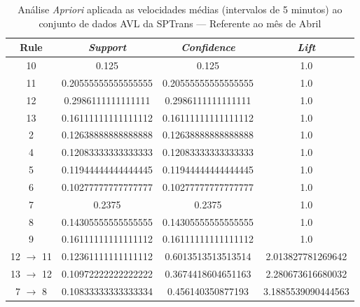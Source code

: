 \documentclass[
	12pt,				%
	oneside,			%
	a4paper,			%
	english,			%
	brazil				%
	]{abntex2ppgsi}
\begin{document}
\begin{apendicesenv}
\begin{table}[!htb]
\centering
\caption {Análise \textit{Apriori} aplicada as velocidades médias (intervalos de 5 minutos) ao conjunto de dados AVL da SPTrans --- Referente ao mês de Abril}
\label {tab:aprioriApril}
\begin{tabular}{c|c|c|c}
\hline
\textbf{Rule} & \textit{\textbf{Support}} & \textit{\textbf{Confidence}} & \textit{\textbf{Lift}} \\
\hline 
10 &  0.125 &  0.125 &  1.0\\
\hline
11 &  0.20555555555555555 &  0.20555555555555555 &  1.0\\
\hline
12 &  0.2986111111111111 &  0.2986111111111111 &  1.0\\
\hline
13 &  0.16111111111111112 &  0.16111111111111112 &  1.0\\
\hline
2 &  0.12638888888888888 &  0.12638888888888888 &  1.0\\
\hline
4 &  0.12083333333333333 &  0.12083333333333333 &  1.0\\
\hline
5 &  0.11944444444444445 &  0.11944444444444445 &  1.0\\
\hline
6 &  0.10277777777777777 &  0.10277777777777777 &  1.0\\
\hline
7 &  0.2375 &  0.2375 &  1.0\\
\hline
8 &  0.14305555555555555 &  0.14305555555555555 &  1.0\\
\hline
9 &  0.16111111111111112 &  0.16111111111111112 &  1.0\\
\hline
12  $\rightarrow$ 11 &  0.12361111111111112 &  0.6013513513513514 &  2.013827781269642\\
\hline
13  $\rightarrow$ 12 &  0.10972222222222222 &  0.3674418604651163 &  2.280673616680032\\
\hline
7  $\rightarrow$ 8 &  0.10833333333333334 &  0.456140350877193 &  3.1885539090444563\\
\hline
\end{tabular}
\end{table}


\end{apendicesenv}
\end{document}
